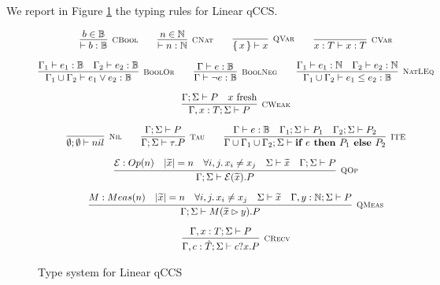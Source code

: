 We report in Figure \ref{typesystem} the typing rules for Linear qCCS.


\begin{figure}[h!]
\caption{Type system for Linear qCCS}
\label{typesystem}
\begin{gather*}
\infer[\mbox{\footnotesize\scshape CBool}]{\vdash b : \mathbb{B}}{b \in \mathbb{B}} \qquad
\infer[\mbox{\footnotesize\scshape CNat}]{\vdash n : \mathbb{N}}{n \in \mathbb{N}} \qquad
\infer[\mbox{\footnotesize\scshape QVar}]{\set{x} \vdash x}{} \qquad
\infer[\mbox{\footnotesize\scshape CVar}]{x : T \vdash x : T}{} \\[0.2cm]
\infer[\mbox{\footnotesize\scshape BoolOr}]{\Gamma_1 \cup \Gamma_2 \vdash e_1 \lor e_2 : \mathbb{B}}{\Gamma_1 \vdash e_1 : \mathbb{B} & \Gamma_2 \vdash e_2 : \mathbb{B}} \qquad
\infer[\mbox{\footnotesize\scshape BoolNeg}]{\Gamma \vdash \neg e : \mathbb{B}}{\Gamma \vdash e : \mathbb{B}} \qquad
\infer[\mbox{\footnotesize\scshape NatLEq}]{\Gamma_1 \cup \Gamma_2 \vdash e_1 \leq e_2 : \mathbb{B}}{\Gamma_1 \vdash e_1 : \mathbb{N} & \Gamma_2 \vdash e_2 : \mathbb{N}} \\[0.2cm]
 \infer[\mbox{\footnotesize\scshape CWeak}]{\Gamma, x : T; \Sigma \vdash P}{\Gamma; \Sigma \vdash P & \text{$x$ fresh}} \\[0.2cm]
\infer[\mbox{\footnotesize\scshape Nil}]{\emptyset; \emptyset \vdash nil}{} \qquad
\infer[\mbox{\footnotesize\scshape Tau}]{\Gamma; \Sigma \vdash \tau . P}{ \Gamma; \Sigma \vdash P} \qquad
\infer[\mbox{\footnotesize\scshape ITE}]{\Gamma \cup \Gamma_1 \cup \Gamma_2; \Sigma \vdash \ite{e}{P_1}{P_2}}{\Gamma \vdash e : \mathbb{B} & \Gamma_1; \Sigma \vdash P_1 & \Gamma_2; \Sigma \vdash P_2} \\[0.2cm]
\infer[\mbox{\footnotesize\scshape QOp}]
{\Gamma; \Sigma \vdash \mathcal{E}(\widetilde{x}) . P}
{\mathcal{E}: Op(n) & |\widetilde{x}| = n & \forall i, j \ldotp x_i \neq x_j & \Sigma \vdash \widetilde{x} & \Gamma; \Sigma \vdash P} \\[0.2cm]
\infer[\mbox{\footnotesize\scshape QMeas}]{\Gamma; \Sigma \vdash M(\widetilde{x} \rhd y) . P}
{M: Meas(n) & |\widetilde{x}| = n &  \forall i, j \ldotp x_i \neq x_j  & \Sigma \vdash \widetilde{x} & \Gamma, y : \mathbb{N}; \Sigma \vdash P} \\[0.2cm]
\infer[\mbox{\footnotesize\scshape CRecv}]
{\Gamma, c : \hat{T}; \Sigma \vdash c?x . P}
{\Gamma, x : T; \Sigma \vdash P} 

\end{gather*}
\end{figure}
